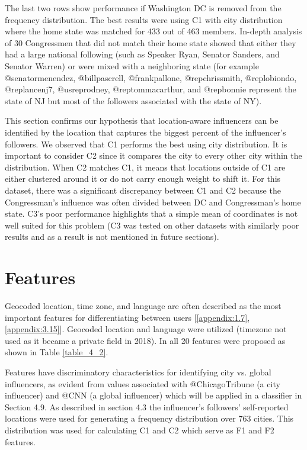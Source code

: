 The last two rows show performance if Washington DC is removed from the frequency distribution. The best results were using C1 with city distribution where the home state was matched for 433 out of 463 members. In-depth analysis of 30 Congressmen that did not match their home state showed that either they had a large national following (such as Speaker Ryan, Senator Sanders, and Senator Warren) or were mixed with a neighboring state (for example @senatormenendez, @billpascrell, @frankpallone, @repchrissmith, @replobiondo, @replancenj7, @usreprodney, @reptommacarthur, and @repbonnie represent the state of NJ but most of the followers associated with the state of NY).

This section confirms our hypothesis that location-aware influencers can be identified by the location that captures the biggest percent of the influencer's followers. We observed that C1 performs the best using city distribution. It is important to consider C2 since it compares the city to every other city within the distribution. When C2 matches C1, it means that locations outside of C1 are either clustered around it or do not carry enough weight to shift it. For this dataset, there was a significant discrepancy between C1 and C2 because the Congressman's influence was often divided between DC and Congressman's home state. C3's poor performance highlights that a simple mean of coordinates is not well suited for this problem (C3 was tested on other datasets with similarly poor results and as a result is not mentioned in future sections). 

\section{Features}


Geocoded location, time zone, and language are often described as the most important features for differentiating between users [\ref{appendix:1.7}, \ref{appendix:3.15}]. Geocoded location and language were utilized (timezone not used as it became a private field in 2018). In all 20 features were proposed as shown in Table \ref{table_4_2}. 

Features have discriminatory characteristics for identifying city vs. global influencers, as evident from values associated with @ChicagoTribune (a city influencer) and @CNN (a global influencer) which will be applied in a classifier in Section 4.9. As described in section 4.3 the influencer's followers' self-reported locations were used for generating a frequency distribution over 763 cities. 
This distribution was used for calculating C1 and C2 which serve as F1 and F2 features. 

